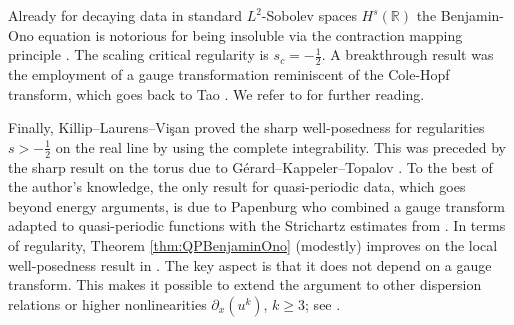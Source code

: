 \documentclass{amsart}
\theoremstyle{definition}
\newcommand{\R}{\mathbb{R}}
\newcommand{\T}{\mathbb{T}}
\begin{document}
Already for decaying data in standard $L^2$-Sobolev spaces $H^s(\R)$ the Benjamin-Ono equation is notorious for being insoluble via the contraction mapping principle \cite{MolinetSautTzvetkov2001,KochTzvetkov2005}. The scaling critical regularity is $s_c = -\frac{1}{2}$. A breakthrough result was the employment of a gauge transformation reminiscent of the Cole-Hopf transform, which goes back to Tao \cite{Tao2004}. We refer to \cite{KochTzvetkov2003,IonescuKenig2007,BurqPlanchon2008,
Molinet2008} for further reading.

Finally, Killip--Laurens--Vi\c{s}an \cite{KillipLaurensVisan2024} proved the sharp well-posedness for regularities $s > -\frac{1}{2}$ on the real line by using the complete integrability. This was preceded by the sharp result on the torus due to G\'erard--Kappeler--Topalov \cite{GerardKappelerTopalov2023}. To the best of the author's knowledge, the only result for quasi-periodic data, which goes beyond energy arguments, is due to Papenburg \cite{Papenburg2025BenjaminOno} who combined a gauge transform adapted to quasi-periodic functions with the Strichartz estimates from \cite{Schippa2025Quasiperiodic}. In terms of regularity, Theorem \ref{thm:QPBenjaminOno} (modestly) improves on the local well-posedness result in \cite{Papenburg2025BenjaminOno}. The key aspect is that it does not depend on a gauge transform. This makes it possible to extend the argument to other dispersion relations or higher nonlinearities $\partial_x (u^k)$, $k \geq 3$; see \cite{ShorttimeFourierTransformRestriction}.



\end{document}
